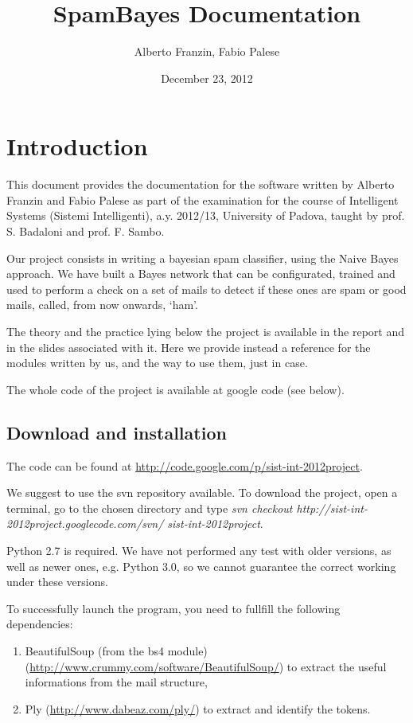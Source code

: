 \documentclass[letterpaper,10pt,english]{sphinxmanual}
\title{SpamBayes Documentation}
\date{December 23, 2012}
\author{Alberto Franzin, Fabio Palese}
\begin{document}
\maketitle
\tableofcontents
{}\label{index::doc}



\chapter{Introduction}
\label{index:introduction}\label{index:spambayes-s-documentation}
This document provides the documentation for the software written by Alberto Franzin and Fabio Palese as part of the examination for the course of Intelligent Systems (Sistemi Intelligenti), a.y. 2012/13, University of Padova, taught by prof. S. Badaloni and prof. F. Sambo.

Our project consists in writing a bayesian spam classifier, using the Naive Bayes approach. We have built a Bayes network that can be configurated, trained and used to perform a check on a set of mails to detect if these ones are spam or good mails, called, from now onwards, `ham'.

The theory and the practice lying below the project is available in the report and in the slides associated with it. Here we provide instead a reference for the modules written by us, and the way to use them, just in case.

The whole code of the project is available at google code (see below).


\section{Download and installation}
\label{index:download-and-installation}
The code can be found at \href{http://code.google.com/p/sist-int-2012project}{http://code.google.com/p/sist-int-2012project}.

We suggest to use the svn repository available. To download the project, open a terminal, go to the chosen directory and type
\emph{svn checkout http://sist-int-2012project.googlecode.com/svn/ sist-int-2012project}.

Python 2.7 is required. We have not performed any test with older versions, as well as newer ones, e.g. Python 3.0, so we cannot guarantee the correct working under these versions.

To successfully launch the program, you need to fullfill the following dependencies:
\begin{enumerate}
\item {} 
BeautifulSoup (from the bs4 module) (\href{http://www.crummy.com/software/BeautifulSoup/}{http://www.crummy.com/software/BeautifulSoup/}) to extract the useful informations from the mail structure,

\item {} 
Ply (\href{http://www.dabeaz.com/ply/}{http://www.dabeaz.com/ply/}) to extract and identify the tokens.

\end{enumerate}
\end{document}
